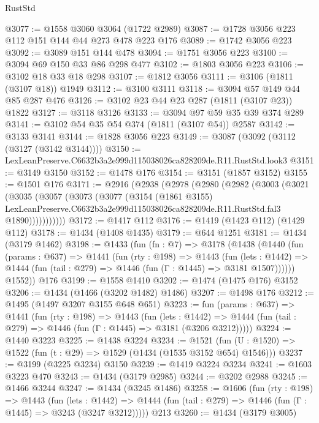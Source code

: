 \begin{lexlean}{RustStd}
\begin{coremodule}
@3077 := @1558 @3060 @3064 (@1722 @2989)
@3087 := @1728 @3056 @223 @112 @151 @144 @44 @273 @478 @223 @176
@3089 := @1742 @3056 @223
@3092 := @3089 @151 @144 @478
@3094 := @1751 @3056 @223
@3100 := @3094 @69 @150 @33 @86 @298 @477
@3102 := @1803 @3056 @223
@3106 := @3102 @18 @33 @18 @298
@3107 := @1812 @3056
@3111 := @3106 (@1811 (@3107 @18)) @1949
@3112 := @3100 @3111
@3118 := @3094 @57 @149 @44 @85 @287 @476
@3126 := @3102 @23 @44 @23 @287 (@1811 (@3107 @23)) @1822
@3127 := @3118 @3126
@3133 := @3094 @97 @59 @35 @39 @374 @289
@3141 := @3102 @54 @35 @54 @374 (@1811 (@3107 @54)) @2587
@3142 := @3133 @3141
@3144 := @1828 @3056 @223
@3149 := @3087 (@3092 (@3112 (@3127 (@3142 @3144))))
@3150 := LexLeanPreserve.C6632b3a2e999d115038026ca828209de.R11.RustStd.look3
@3151 := @3149 @3150
@3152 := @1478 @176
@3154 := @3151 (@1857 @3152)
@3155 := @1501 @176
@3171 := @2916
    (@2938
      (@2978
        (@2980
          (@2982
            (@3003
              (@3021
                (@3035
                  (@3057
                    (@3073
                      (@3077
                        (@3154
                          (@1861 @3155)
                          LexLeanPreserve.C6632b3a2e999d115038026ca828209de.R11.RustStd.fal3
                          @1890)))))))))))
@3172 := @1417 @112
@3176 := @1419 (@1423 @112) (@1429 @112)
@3178 := @1434 (@1408 @1435)
@3179 := @644 @1251
@3181 := @1434 (@3179 @1462)
@3198 := @1433
    (fun (fn : @7) =>
    @3178
      (@1438
        (@1440
          (fun (params : @637) =>
          @1441
            (fun (rty : @198) =>
            @1443
              (fun (lets : @1442) =>
              @1444 (fun (tail : @279) => @1446 (fun (Γ : @1445) => @3181 @1507))))))
        @1552))
    @176
@3199 := @1558 @1410
@3202 := @1474 (@1475 @176) @3152
@3206 := @1434 (@1466 (@3202 @1482) @1486)
@3207 := @1498 @176
@3212 := @1495 (@1497 @3207 @3155 @648 @651)
@3223 := fun (params : @637) =>
  @1441
    (fun (rty : @198) =>
    @1443
      (fun (lets : @1442) =>
      @1444 (fun (tail : @279) => @1446 (fun (Γ : @1445) => @3181 (@3206 @3212)))))
@3224 := @1440 @3223
@3225 := @1438 @3224
@3234 := @1521 (fun (U : @1520) => @1522 (fun (t : @29) => @1529 (@1434 (@1535 @3152 @654) @1546)))
@3237 := @3199 (@3225 @3234) @3150
@3239 := @1419 @3224 @3234
@3241 := @1603 @3223 @470
@3243 := @1434 (@3179 @2985)
@3244 := @3202 @2988
@3245 := @1466 @3244
@3247 := @1434 (@3245 @1486)
@3258 := @1606
    (fun (rty : @198) =>
    @1443
      (fun (lets : @1442) =>
      @1444 (fun (tail : @279) => @1446 (fun (Γ : @1445) => @3243 (@3247 @3212)))))
    @213
@3260 := @1434 (@3179 @3005)

\end{coremodule}
\end{lexlean}
